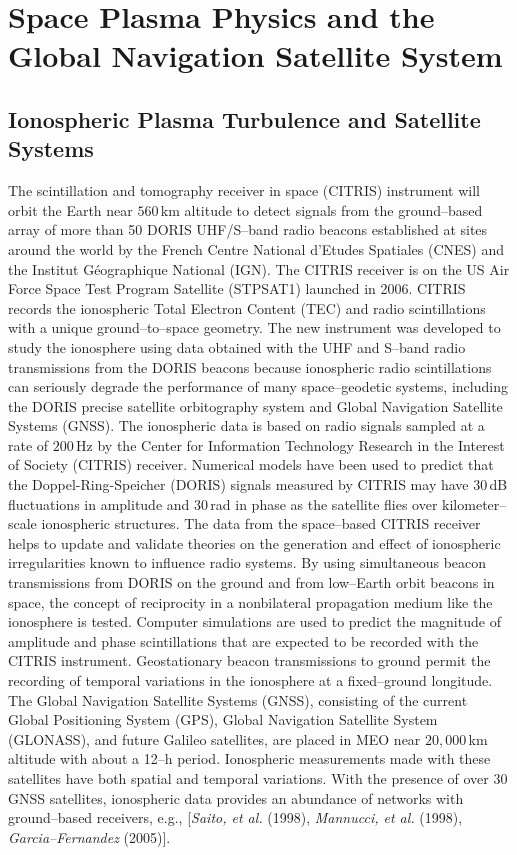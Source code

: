 \documentclass[a4paper,openany,12pt]{book}
\begin{document}
\chapter[Space Plasma Physics]{Space Plasma Physics and the Global Navigation Satellite System}

\section{Ionospheric Plasma Turbulence and Satellite Systems}

The scintillation and tomography receiver in space (CITRIS) instrument will orbit the Earth near $560\,$km altitude to detect signals from the ground--based array of more than 50 DORIS UHF/S--band radio beacons established at sites around the world by the French Centre National d'Etudes Spatiales (CNES) and the Institut 
G\'eographique National (IGN). The CITRIS receiver is on the US Air Force Space Test Program Satellite (STPSAT1) launched in 2006. CITRIS records the ionospheric Total Electron Content (TEC) and radio scintillations with a unique ground--to--space geometry. The new instrument was developed to study the ionosphere using data obtained with the UHF and S--band radio transmissions from the DORIS beacons because ionospheric radio scintillations can seriously degrade the performance of many space--geodetic systems, including the DORIS precise satellite orbitography system and Global Navigation Satellite Systems (GNSS). The ionospheric data is based on radio signals sampled at a rate of $200\,$Hz by the Center for Information Technology Research in the Interest of Society (CITRIS) receiver. Numerical models have been used to predict that the  Doppel-Ring-Speicher (DORIS) signals measured by CITRIS may have $30\,$dB fluctuations in amplitude and $30\,$rad in phase as the satellite flies over kilometer--scale ionospheric structures. The data from the space--based CITRIS receiver helps to update and validate theories on the generation and effect of ionospheric irregularities known to influence radio systems. By using simultaneous beacon transmissions from DORIS on the ground and from low--Earth orbit beacons in space, the concept of reciprocity in a nonbilateral propagation medium like the ionosphere is tested. Computer simulations are used to predict the magnitude of amplitude and phase scintillations that are expected to be recorded with the CITRIS instrument. Geostationary beacon transmissions to ground permit the recording of temporal variations in the ionosphere at a fixed--ground longitude. The Global Navigation Satellite Systems (GNSS), consisting of the current Global Positioning System (GPS), Global Navigation Satellite System (GLONASS), and future Galileo satellites, are placed in MEO near $20,000\,$km altitude with about a 12--h period. Ionospheric measurements made with these satellites have both spatial and temporal variations. With the presence of over $30\,$GNSS satellites, ionospheric data provides an abundance of networks with ground--based receivers, e.g., [\emph{Saito, et al.} (1998), \emph{Mannucci, et al.} (1998), \emph{Garcia--Fernandez} (2005)]. 
\end{document}
